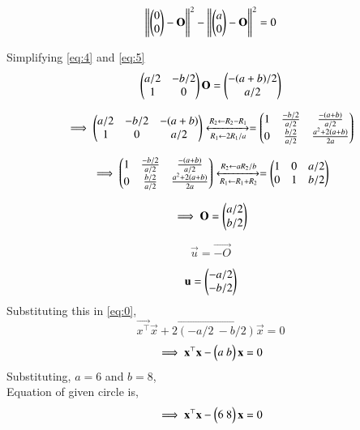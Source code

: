 \documentclass[journal,12pt,twocolumn]{IEEEtran}
\begin{document}
\begin{equation}
\left\lVert {\ensuremath{\begin{pmatrix}0\\0\end{pmatrix}}-\mathbf{O}}\right\rVert^2 - \left\lVert {\ensuremath{\begin{pmatrix}a\\0\end{pmatrix}}-\mathbf{O}}\right\rVert^2= 0 \label{eq:5}
\end{equation}


Simplifying \ref{eq:4} and \ref{eq:5}
\begin{equation}
    \begin{pmatrix}a/2 & -b/2 \\ 1 & 0\end{pmatrix}\mathbf{O}= \begin{pmatrix}-(a+b)/2 \\ a/2\end{pmatrix}
\end{equation}



\begin{equation}
\implies \begin{pmatrix}a/2 & -b/2 & -(a+b) \\ 1 & 0 & a/2\end{pmatrix}
\xleftrightarrow [R_1\leftarrow 2R_1/a]{R_2\leftarrow R_2-R_1}
=
\begin{pmatrix}1 & \frac{-b/2}{a/2} & \frac{-(a+b)}{a/2} \\ 0& \frac{b/2}{a/2} & \frac{a^2+2(a+b)}{2a}\end{pmatrix}
\end{equation}


\begin{equation}
  \implies \begin{pmatrix}1 & \frac{-b/2}{a/2} & \frac{-(a+b)}{a/2} \\ 0& \frac{b/2}{a/2} & \frac{a^2+2(a+b)}{2a}\end{pmatrix}
  \xleftrightarrow [R_1\leftarrow R_1+R_2]{R_2\leftarrow aR_2/b}
=
\begin{pmatrix}1 & 0 & a/2 \\ 0& 1 & b/2\end{pmatrix}
\end{equation}


\begin{equation}
    \implies \mathbf{O}=\begin{pmatrix}a/2 \\ b/2\end{pmatrix} 
\end{equation}

\begin{equation}
    \vec{u} = \vec{-O}
\end{equation}

\begin{equation}
    \mathbf{u} = \begin{pmatrix}-a/2\\-b/2\end{pmatrix}
\end{equation}
Substituting this in \ref{eq:0},
\begin{equation}
    \vec{x^\top}\vec{x}+2\vec{(-a/2 \ -b/2)}\vec{x}=0 
\end{equation}
\begin{equation}
   \implies \mathbf{x^\top}\mathbf{x}-\begin{pmatrix}a \ b \end{pmatrix}\mathbf{x}=0
\end{equation}
Substituting, $a=6$ and $b=8$,\\
Equation of given circle is,
\begin{equation}
   \implies \mathbf{x^\top}\mathbf{x}-\begin{pmatrix}6 \ 8 \end{pmatrix}\mathbf{x}=0
\end{equation}
\end{document}
